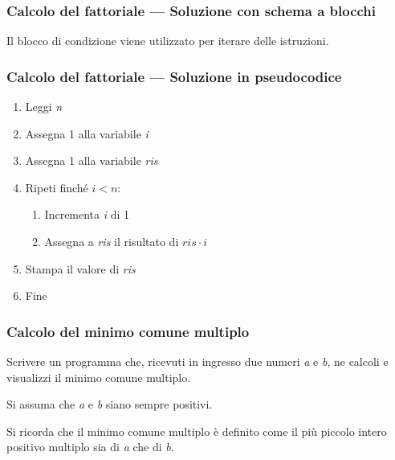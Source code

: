 \documentclass[aspectratio=169]{beamer}
\begin{document}
\begin{frame}
\frametitle{Calcolo del fattoriale --- Soluzione con schema a blocchi}
		\centering
{}

    Il blocco di condizione viene utilizzato per \alert{iterare} delle istruzioni.
\end{frame}

\begin{frame}
\frametitle{Calcolo del fattoriale --- Soluzione in pseudocodice}
\begin{enumerate}
	\item Leggi \emph{n}
	\item Assegna 1 alla variabile \emph{i}
	\item Assegna 1 alla variabile \emph{ris}
	\item Ripeti finché $i < n$:
	\begin{enumerate}
		\item Incrementa \emph{i} di 1
		\item Assegna a \emph{ris} il risultato di $ris \cdot i$
	\end{enumerate}
	\item Stampa il valore di \emph{ris}
	\item Fine
\end{enumerate}
\end{frame}

\begin{frame}
\frametitle{Calcolo del minimo comune multiplo}
Scrivere un programma che, ricevuti in ingresso due numeri \emph{a} e \emph{b}, ne calcoli e visualizzi il minimo comune multiplo.

Si assuma che \emph{a} e \emph{b} siano sempre positivi.

Si ricorda che il minimo comune multiplo è definito come il più piccolo intero positivo multiplo sia di \emph{a} che di \emph{b}.
\end{frame}
\end{document}
